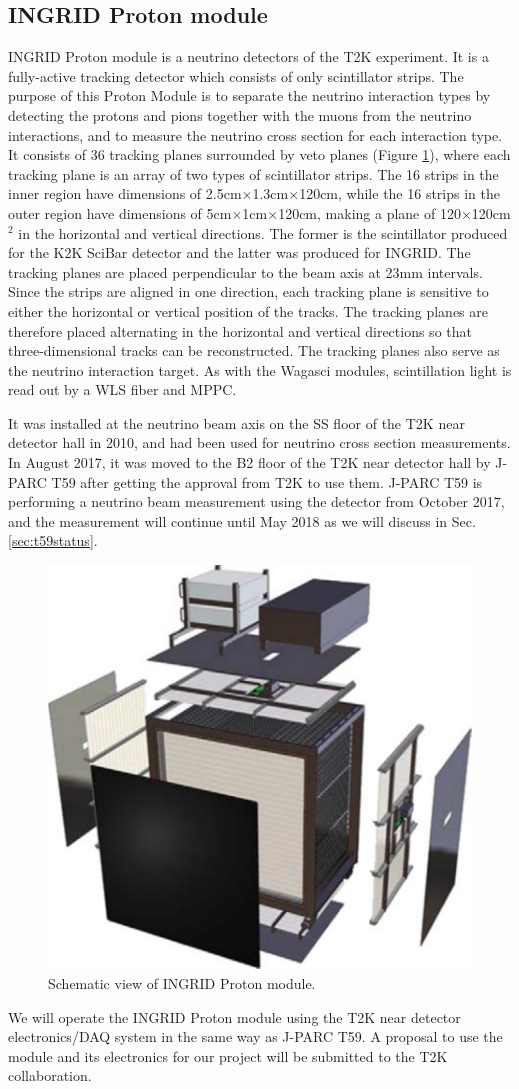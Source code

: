 \subsection{INGRID Proton module}
INGRID Proton module is a neutrino detectors of the T2K experiment.
It is a fully-active tracking detector which consists of only scintillator strips. 
The purpose of this Proton Module is to separate the neutrino interaction types by detecting the protons and pions together with the muons from the neutrino interactions, and to measure the neutrino cross section for each interaction type.
It consists of 36 tracking planes surrounded by veto planes (Figure \ref{fig:proton_module}), where each tracking plane is an array of two types of scintillator strips. 
The 16 strips in the inner region have dimensions of 2.5cm$\times$1.3cm$\times$120cm, while the 16 strips in the outer region have dimensions of 5cm$\times$1cm$\times$120cm, making a plane of 120$\times$120cm$^{2}$ in the horizontal and vertical directions.
The former is the scintillator produced for the K2K SciBar detector \cite{scibar} and the latter was produced for INGRID.
The tracking planes are placed perpendicular to the beam axis at 23mm intervals.
Since the strips are aligned in one direction, each tracking plane is sensitive to either the horizontal or vertical position of the tracks.
The tracking planes are therefore placed alternating in the horizontal and vertical directions so that three-dimensional tracks can be reconstructed.
The tracking planes also serve as the neutrino interaction target.
As with the Wagasci modules, scintillation light is read out by a WLS fiber and MPPC.


It was installed at the neutrino beam axis on the SS floor of the T2K near detector hall in 2010, and had been used for neutrino cross section measurements.
In August 2017, it was moved to the B2 floor of the T2K near detector hall by J-PARC T59 after getting the approval from T2K to use them.
J-PARC T59 is performing a  neutrino beam measurement using the detector from October 2017, and the measurement  will continue until May 2018 as we will discuss in Sec. \ref{sec:t59status}.

\begin{figure}[tbh]
\begin{center}
\includegraphics[width=0.6\linewidth]{fig/proton_module.pdf}
\end{center}
\caption{
Schematic view of INGRID Proton module.
}
\label{fig:proton_module}
\end{figure}


We will operate the INGRID Proton module using the T2K near detector electronics/DAQ system in the same way as J-PARC T59.
A proposal to use the module and its electronics for our project will be submitted to the T2K collaboration.

